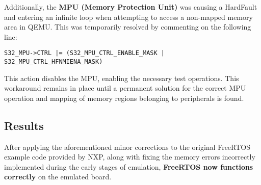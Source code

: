 Additionally, the \textbf{MPU (Memory Protection Unit)} was causing a HardFault and entering an infinite loop when attempting to access a non-mapped memory area in QEMU. This was temporarily resolved by commenting on the following line:

\texttt{S32\_MPU->CTRL |= (S32\_MPU\_CTRL\_ENABLE\_MASK | S32\_MPU\_CTRL\_HFNMIENA\_MASK)}

\noindent This action disables the MPU, enabling the necessary test operations. This workaround remains in place until a permanent solution for the correct MPU operation and mapping of memory regions belonging to peripherals is found.


\subsection{Results}

After applying the aforementioned minor corrections to the original FreeRTOS example code provided by NXP, along with fixing the memory errors incorrectly implemented during the early stages of emulation, \textbf{FreeRTOS now functions correctly} on the emulated board.
